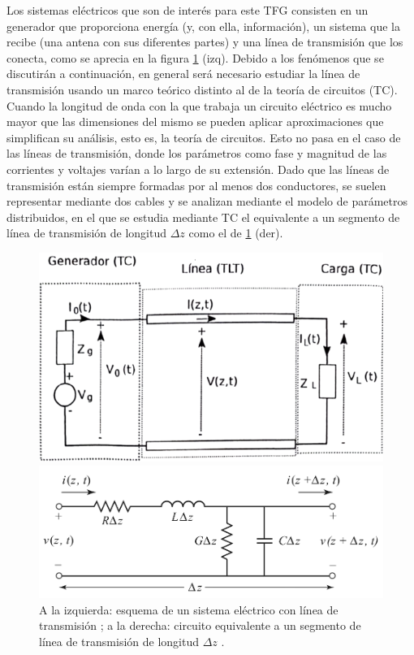 \documentclass[11pt,a4paper,twoside,pdf]{article}
\numberwithin{equation}{section}
\begin{document}
Los sistemas eléctricos que son de interés para este TFG consisten en un generador que proporciona energía (y, con ella, información), un sistema que la recibe (una antena con sus diferentes partes) y una línea de transmisión que los conecta, como se aprecia en la figura \ref{fig:esqmLineaTransmision} (izq). Debido a los fenómenos que se discutirán a continuación, en general será necesario estudiar la línea de transmisión usando un marco teórico distinto al de la teoría de circuitos (TC).\\

Cuando la longitud de onda con la que trabaja un circuito eléctrico es mucho mayor que las dimensiones del mismo se pueden aplicar aproximaciones que simplifican su análisis, esto es, la teoría de circuitos. Esto no pasa en el caso de las líneas de transmisión, donde los parámetros como fase y magnitud de las corrientes y voltajes varían a lo largo de su extensión. Dado que las líneas de transmisión están siempre formadas por al menos dos conductores, se suelen representar mediante dos cables y se analizan mediante el modelo de parámetros distribuidos, en el que se estudia mediante TC el equivalente a un segmento de línea de transmisión de longitud $\Delta z$ como el de \ref{fig:esqmLineaTransmision} (der).

\begin{figure}[!h] \label{fig:esqmLineaTransmision}
\begin{minipage}[c]{.49\linewidth}
\includegraphics[width=0.9\linewidth]{img/fundTeo/LTAlfonso.png}
\end{minipage}\hfill
\begin{minipage}[c]{.49\linewidth}
\includegraphics[width=\linewidth]{img/fundTeo/lineaTransmision.png}
\end{minipage}
\caption{A la izquierda: esquema de un sistema eléctrico con línea de transmisión \cite{alfonsoSalinas}; a la derecha: circuito equivalente a un segmento de línea de transmisión de longitud $\Delta z$ \cite{pozar}.}
\label{fig:esqmLineaTransmision}
\end{figure}
\end{document}
